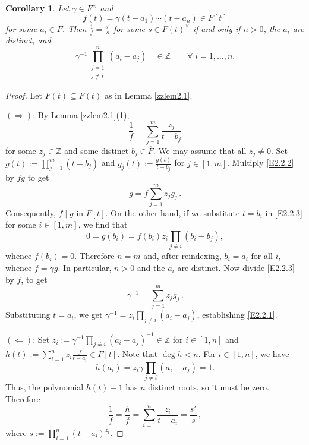 \documentclass[12pt]{amsart}
\theoremstyle{plain}
\newtheorem{corollary}[theorem]{Corollary}
\numberwithin{theorem}{section}
\numberwithin{equation}{theorem}
\theoremstyle{definition}
\newcommand{\ZZ}{\mathbb{Z}}
\begin{document}
\begin{corollary}  
\label{zzcor2.2}
Let $\gamma \in F^\times$ and
$$
f(t) = \gamma (t-a_1) \cdots (t-a_n) \in F[t]
$$
for some $a_i \in F$.
Then $\frac1f = \frac{s'}s$ for some $s \in F(t)^\times$ 
if and only if $n>0$, the $a_i$ are distinct, and
\begin{equation} 
\label{E2.2.1}\tag{E2.2.1}
\gamma^{-1} \prod_{\substack{j=1\\ j\ne i}}^n (a_i-a_j)^{-1} 
\in \ZZ \qquad \forall\; i=1,\dots,n.
\end{equation}
\end{corollary}

\begin{proof} Let $F(t) \subseteq \overline{F}(t)$ as in Lemma 
\ref{zzlem2.1}.

$(\Longrightarrow)$: By Lemma \ref{zzlem2.1}(1), 
\begin{equation} 
\label{E2.2.2}\tag{E2.2.2}
\frac1f = \sum_{j=1}^m \frac{z_j}{t-b_j}
\end{equation}
for some $z_j \in \ZZ$ and some distinct $b_j \in 
\overline{F}$. We may assume that all $z_j \ne 0$. 
Set $g(t) := \prod_{j=1}^m (t-b_j)$ and 
$g_j(t) := \frac{g(t)}{t-b_j}$ for $j \in [1,m]$. 
Multiply \eqref{E2.2.2} by $fg$ to get
\begin{equation} 
\label{E2.2.3}\tag{E2.2.3}
g = f \sum_{j=1}^m z_j g_j \,.
\end{equation} 
Consequently, $f \mid g$ in $\overline{F}[t]$. On the 
other hand, if we substitute $t=b_i$ in \eqref{E2.2.3} 
for some $i \in [1,m]$, we find that
$$
0 = g(b_i) = f(b_i) z_i \prod_{j\ne i} (b_i-b_j),
$$
whence $f(b_i) = 0$. Therefore $n=m$ and, after 
reindexing, $b_i = a_i$ for all $i$, whence $f = \gamma g$. 
In particular, $n>0$ and the $a_i$ are distinct. Now 
divide \eqref{E2.2.3} by $f$, to get
$$
\gamma^{-1} = \sum_{j=1}^m z_j g_j \,.
$$
Substituting $t=a_i$, we get 
$\gamma^{-1} = z_i \prod_{j\ne i}(a_i-a_j)$, establishing 
\eqref{E2.2.1}.

$(\Longleftarrow)$: Set 
$z_i := \gamma^{-1} \prod_{j\ne i} (a_i-a_j)^{-1} \in \ZZ$ 
for $i \in [1,n]$ and 
$h(t) := \sum_{i=1}^n z_i \frac{f}{t-a_i} \in F[t]$. Note 
that $\deg h < n$. For $i \in [1,n]$, we have
$$
h(a_i) = z_i \gamma \prod_{j\ne i} (a_i-a_j) = 1.
$$
Thus, the polynomial $h(t)-1$ has $n$ distinct roots, so it 
must be zero. Therefore
$$
\frac1f = \frac{h}{f} = \sum_{i=1}^n \frac{z_i}{t-a_i} 
= \frac{s'}{s} \,,
$$
where $s := \prod_{i=1}^n (t-a_i)^{z_i}$.
\end{proof}
\end{document}
